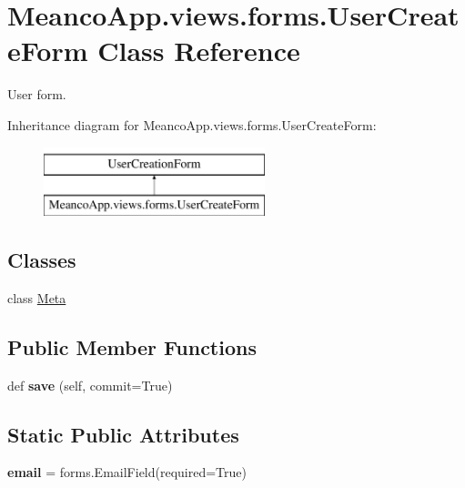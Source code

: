\hypertarget{class_meanco_app_1_1views_1_1forms_1_1_user_create_form}{}\section{Meanco\+App.\+views.\+forms.\+User\+Create\+Form Class Reference}
\label{class_meanco_app_1_1views_1_1forms_1_1_user_create_form}


User form.  


Inheritance diagram for Meanco\+App.\+views.\+forms.\+User\+Create\+Form\+:\begin{figure}[H]
\begin{center}
\leavevmode
\includegraphics[height=2.000000cm]{class_meanco_app_1_1views_1_1forms_1_1_user_create_form}
\end{center}
\end{figure}
\subsection*{Classes}
\begin{DoxyCompactItemize}
\item 
class \hyperlink{class_meanco_app_1_1views_1_1forms_1_1_user_create_form_1_1_meta}{Meta}
\end{DoxyCompactItemize}
\subsection*{Public Member Functions}
\begin{DoxyCompactItemize}
\item 
\hypertarget{class_meanco_app_1_1views_1_1forms_1_1_user_create_form_a5bfa34faa4dcbcc73b31197bccf0e83a}{}\label{class_meanco_app_1_1views_1_1forms_1_1_user_create_form_a5bfa34faa4dcbcc73b31197bccf0e83a} 
def {\bfseries save} (self, commit=True)
\end{DoxyCompactItemize}
\subsection*{Static Public Attributes}
\begin{DoxyCompactItemize}
\item 
\hypertarget{class_meanco_app_1_1views_1_1forms_1_1_user_create_form_a30855fe2b9b8b1eb3b47cc726d725edd}{}\label{class_meanco_app_1_1views_1_1forms_1_1_user_create_form_a30855fe2b9b8b1eb3b47cc726d725edd} 
{\bfseries email} = forms.\+Email\+Field(required=True)
\end{DoxyCompactItemize}


